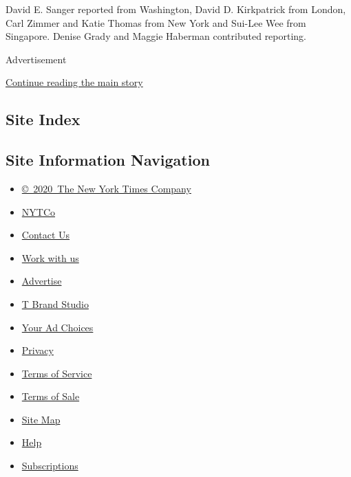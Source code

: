 David E. Sanger reported from Washington, David D. Kirkpatrick from
London, Carl Zimmer and Katie Thomas from New York and Sui-Lee Wee from
Singapore. Denise Grady and Maggie Haberman contributed reporting.

Advertisement

\protect\hyperlink{after-bottom}{Continue reading the main story}

\hypertarget{site-index}{%
\subsection{Site Index}\label{site-index}}

\hypertarget{site-information-navigation}{%
\subsection{Site Information
Navigation}\label{site-information-navigation}}

\begin{itemize}
\tightlist
\item
  \href{https://help.nytimes3xbfgragh.onion/hc/en-us/articles/115014792127-Copyright-notice}{©~2020~The
  New York Times Company}
\end{itemize}

\begin{itemize}
\tightlist
\item
  \href{https://www.nytco.com/}{NYTCo}
\item
  \href{https://help.nytimes3xbfgragh.onion/hc/en-us/articles/115015385887-Contact-Us}{Contact
  Us}
\item
  \href{https://www.nytco.com/careers/}{Work with us}
\item
  \href{https://nytmediakit.com/}{Advertise}
\item
  \href{http://www.tbrandstudio.com/}{T Brand Studio}
\item
  \href{https://www.nytimes3xbfgragh.onion/privacy/cookie-policy\#how-do-i-manage-trackers}{Your
  Ad Choices}
\item
  \href{https://www.nytimes3xbfgragh.onion/privacy}{Privacy}
\item
  \href{https://help.nytimes3xbfgragh.onion/hc/en-us/articles/115014893428-Terms-of-service}{Terms
  of Service}
\item
  \href{https://help.nytimes3xbfgragh.onion/hc/en-us/articles/115014893968-Terms-of-sale}{Terms
  of Sale}
\item
  \href{https://spiderbites.nytimes3xbfgragh.onion}{Site Map}
\item
  \href{https://help.nytimes3xbfgragh.onion/hc/en-us}{Help}
\item
  \href{https://www.nytimes3xbfgragh.onion/subscription?campaignId=37WXW}{Subscriptions}
\end{itemize}
